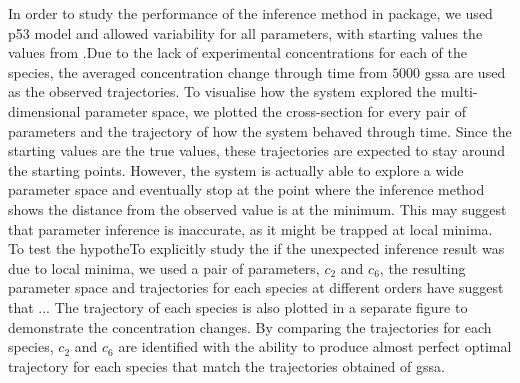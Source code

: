 

In order to study the performance of the inference method in \means package, we used p53 model and allowed variability for all parameters, with starting values the values from .Due to the lack of experimental concentrations for each of the species, the averaged concentration change through time from $5000$ \gls{gssa} are used as the observed trajectories. To visualise how the system explored the multi-dimensional parameter space, we plotted the cross-section for every pair of parameters and the trajectory of how the system behaved through time. Since the starting values are the true values, these trajectories are expected to stay around the starting points. However, the system is actually able to explore a wide parameter space and eventually stop at the point where the inference method shows the distance from the observed value is at the minimum. This may suggest that parameter inference is inaccurate, as it might be trapped at local minima. 
To test the hypotheTo explicitly study the if the unexpected inference result was due to local minima, we used a pair of parameters, $c_2$ and $c_6$, the resulting parameter space and trajectories for each species at different orders have suggest that ... The trajectory of each species is also plotted in a separate figure to demonstrate the concentration changes. By comparing the trajectories for each species, $c_2$ and $c_6$ are identified with the ability to produce almost perfect optimal trajectory for each species that match the trajectories obtained of \gls{gssa}.